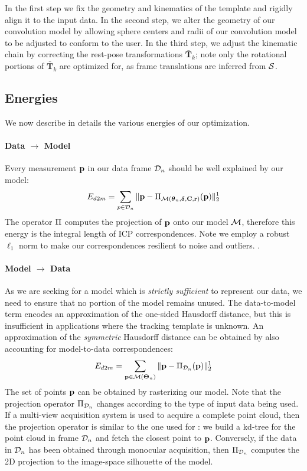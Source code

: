 % 
In the first step we fix the geometry and kinematics of the template and rigidly align it to the input data. In the second step, we alter the geometry of our convolution model by allowing sphere centers and radii of our convolution model to be adjusted to conform to the user. In the third step, we adjust the kinematic chain by correcting the rest-pose transformations $\mathbf{\bar{T}}_k$; note only the rotational portions of $\mathbf{\bar{T}}_k$ are optimized for, as frame translations are inferred from $\mathcal{S}$.



\subsection{Energies}
We now describe in details the various energies of our optimization.

\paragraph{Data $\rightarrow$ Model}
Every measurement $\mathbf{p}$ in our data frame $\mathcal{D}_n$ should be well explained by our model:
\begin{equation}
E_{d2m} = \sum_{p \in \mathcal{D}_n} \| \mathbf{p} - \Pi_{\mathcal{M}(\boldsymbol{\theta}_n, \boldsymbol{\delta}, \mathbf{C}, \mathbf{r})}(\mathbf{p})\|_2^1
\label{eq:d2m}
\end{equation}
% 
The operator $\Pi$ computes the projection of $\mathbf{p}$ onto our model $\mathcal{M}$, therefore this energy is the integral length of ICP correspondences. Note we employ a robust $\ell_1$ norm to make our correspondences resilient to noise and outliers. .

\paragraph{Model $\rightarrow$ Data}
As we are seeking for a model which is \emph{strictly sufficient} to represent our data, we need to ensure that no portion of the model remains unused. The data-to-model term encodes an approximation of the one-sided Hausdorff distance, but this is insufficient in applications where the tracking template is unknown. An approximation of the \emph{symmetric} Hausdorff distance can be obtained by also accounting for model-to-data correspondences:
\begin{equation}
E_{d2m} = \sum_{\mathbf{p} \in \mathcal{M}(\boldsymbol{\Theta}_n)} \| \mathbf{p} - \Pi_{\mathcal{D}_n}(\mathbf{p})\|_2^1
\label{eq:m2d}
\end{equation}
The set of points $\mathbf{p}$ can be obtained by rasterizing our model. Note that the projection operator $\Pi_{\mathcal{D}_n}$ changes according to the type of input data being used. If a multi-view acquisition system is used to acquire a complete point cloud, then the projection operator is similar to the one used for : we build a kd-tree for the point cloud in frame $\mathcal{D}_n$ and fetch the closest point to $\mathbf{p}$. Conversely, if the data in $\mathcal{D}_n$ has been obtained through monocular acquisition, then $\Pi_{\mathcal{D}_n}$ computes the 2D projection to the image-space silhouette of the model.



